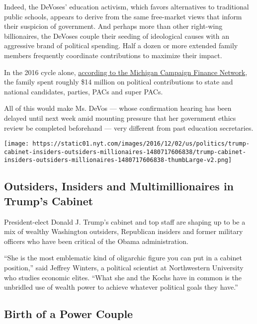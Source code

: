 Indeed, the DeVoses' education activism, which favors alternatives to
traditional public schools, appears to derive from the same free-market
views that inform their suspicion of government. And perhaps more than
other right-wing billionaires, the DeVoses couple their seeding of
ideological causes with an aggressive brand of political spending. Half
a dozen or more extended family members frequently coordinate
contributions to maximize their impact.

In the 2016 cycle alone,
\href{http://mcfn.org/node/6043/devos-family-made-14-million-in-political-contributions-in-the-last-2-years-alone}{according
to the Michigan Campaign Finance Network}, the family spent roughly \$14
million on political contributions to state and national candidates,
parties, PACs and super PACs.

All of this would make Ms. DeVos --- whose confirmation hearing has been
delayed until next week amid mounting pressure that her government
ethics review be completed beforehand --- very different from past
education secretaries.

\href{https://www.nytimes.com/interactive/2016/12/05/us/politics/trump-cabinet-insiders-outsiders-millionaires.html}{}

\texttt{[image: https://static01.nyt.com/images/2016/12/02/us/politics/trump-cabinet-insiders-outsiders-millionaires-1480717606838/trump-cabinet-insiders-outsiders-millionaires-1480717606838-thumbLarge-v2.png]}

\hypertarget{outsiders-insiders-and-multimillionaires-in-trumps-cabinet}{%
\subsection{Outsiders, Insiders and Multimillionaires in Trump's
Cabinet}\label{outsiders-insiders-and-multimillionaires-in-trumps-cabinet}}

President-elect Donald J. Trump's cabinet and top staff are shaping up
to be a mix of wealthy Washington outsiders, Republican insiders and
former military officers who have been critical of the Obama
administration.

``She is the most emblematic kind of oligarchic figure you can put in a
cabinet position,'' said Jeffrey Winters, a political scientist at
Northwestern University who studies economic elites. ``What she and the
Kochs have in common is the unbridled use of wealth power to achieve
whatever political goals they have.''

\hypertarget{birth-of-a-power-couple}{%
\subsection{Birth of a Power Couple}\label{birth-of-a-power-couple}}

